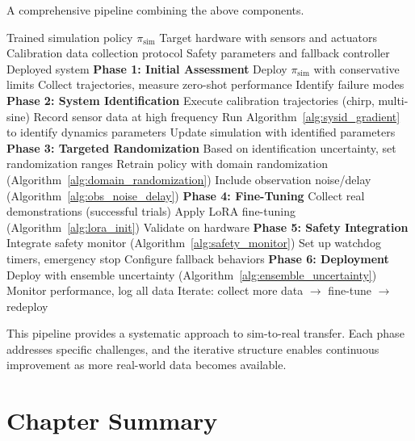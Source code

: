 A comprehensive pipeline combining the above components.

\begin{algorithm}[H]
\caption{Complete Sim-to-Real Deployment Pipeline}
\label{alg:complete_pipeline}
\begin{algorithmic}[1]
\REQUIRE Trained simulation policy $\pi_{\text{sim}}$
\REQUIRE Target hardware with sensors and actuators
\REQUIRE Calibration data collection protocol
\REQUIRE Safety parameters and fallback controller
\ENSURE Deployed system
\STATE
\STATE \textbf{Phase 1: Initial Assessment}
\STATE Deploy $\pi_{\text{sim}}$ with conservative limits
\STATE Collect trajectories, measure zero-shot performance
\STATE Identify failure modes
\STATE
\STATE \textbf{Phase 2: System Identification}
\STATE Execute calibration trajectories (chirp, multi-sine)
\STATE Record sensor data at high frequency
\STATE Run Algorithm~\ref{alg:sysid_gradient} to identify dynamics parameters
\STATE Update simulation with identified parameters
\STATE
\STATE \textbf{Phase 3: Targeted Randomization}
\STATE Based on identification uncertainty, set randomization ranges
\STATE Retrain policy with domain randomization (Algorithm~\ref{alg:domain_randomization})
\STATE Include observation noise/delay (Algorithm~\ref{alg:obs_noise_delay})
\STATE
\STATE \textbf{Phase 4: Fine-Tuning}
\STATE Collect real demonstrations (successful trials)
\STATE Apply LoRA fine-tuning (Algorithm~\ref{alg:lora_init})
\STATE Validate on hardware
\STATE
\STATE \textbf{Phase 5: Safety Integration}
\STATE Integrate safety monitor (Algorithm~\ref{alg:safety_monitor})
\STATE Set up watchdog timers, emergency stop
\STATE Configure fallback behaviors
\STATE
\STATE \textbf{Phase 6: Deployment}
\STATE Deploy with ensemble uncertainty (Algorithm~\ref{alg:ensemble_uncertainty})
\STATE Monitor performance, log all data
\STATE Iterate: collect more data $\to$ fine-tune $\to$ redeploy
\end{algorithmic}
\end{algorithm}

This pipeline provides a systematic approach to sim-to-real transfer. Each phase addresses specific challenges, and the iterative structure enables continuous improvement as more real-world data becomes available.

\section{Chapter Summary}
\label{sec:chapter_summary_sim2real}

